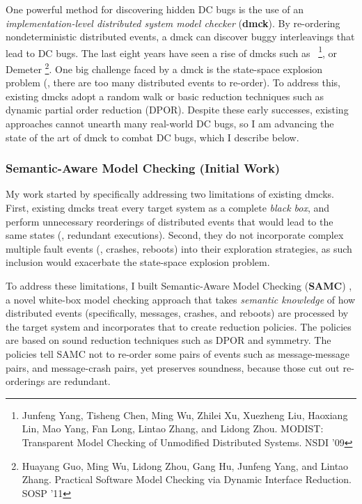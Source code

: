 \documentclass[11pt]{article}
\begin{document}
One powerful method for discovering hidden DC bugs is the use of an
\textit{implementation-level distributed system model checker} (\textbf{dmck}).
By re-ordering nondeterministic distributed events, a dmck can discover buggy
interleavings that lead to DC bugs. The last eight years have seen a rise of
dmcks such as 
\modist\ \footnote{Junfeng Yang, Tisheng Chen, Ming
Wu, Zhilei Xu, Xuezheng Liu, Haoxiang Lin, Mao Yang, Fan Long, Lintao Zhang, and
Lidong Zhou. MODIST: Transparent Model Checking of Unmodified Distributed
Systems. NSDI '09}, or Demeter \footnote{Huayang Guo, Ming Wu, Lidong Zhou, Gang
Hu, Junfeng Yang, and Lintao Zhang. Practical Software Model Checking via
Dynamic Interface Reduction. SOSP '11}. One big challenge faced by a dmck is the
state-space explosion problem (\ie, there are too many distributed events to
re-order). To address this, existing dmcks adopt a random walk or basic
reduction techniques such as dynamic partial order reduction (DPOR). Despite
these early successes, existing approaches cannot unearth many real-world DC
bugs, so I am advancing the state of the art of dmck to combat DC bugs, which I
describe below.

\subsubsection*{Semantic-Aware Model Checking (Initial Work)} 

My work started by specifically addressing two limitations of existing dmcks.
First, existing dmcks treat every target system as a complete \textit{black
box}, and perform unnecessary reorderings of distributed events that
would lead to the same states (\ie, redundant executions). Second,
they do not incorporate complex multiple fault events (\eg, crashes, reboots)
into their exploration strategies, as such inclusion would exacerbate the
state-space explosion problem.

To address these limitations, I built Semantic-Aware Model Checking
(\textbf{SAMC}) \cite{Leesatapornwongsa+15-SamcIssta,Leesatapornwongsa+14-Samc},
a novel white-box model checking approach that takes \textit{semantic knowledge}
of how distributed events (specifically, messages, crashes, and reboots) are
processed by the target system and incorporates that to create reduction
policies. The policies are based on sound reduction techniques such as DPOR and
symmetry. The policies tell SAMC not to re-order some pairs of events such as
message-message pairs, and message-crash pairs, yet preserves soundness, because
those cut out re-orderings are redundant. 
\end{document}
